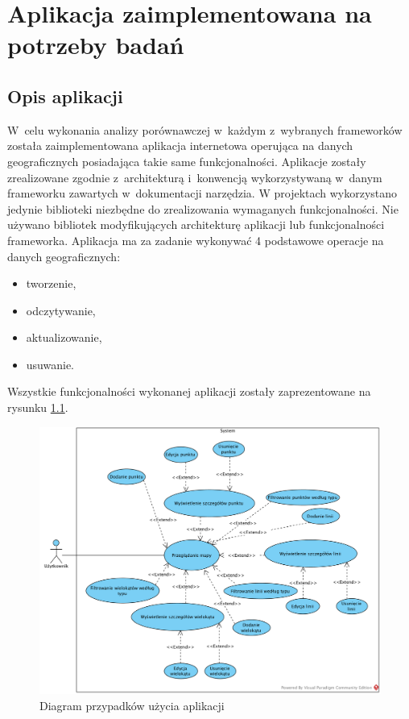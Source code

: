 \documentclass[printmode]{mgr}
\begin{document}
\chapter{Aplikacja zaimplementowana na potrzeby badań}
\section{Opis aplikacji}

W~celu wykonania analizy porównawczej w~każdym z~wybranych frameworków została zaimplementowana aplikacja internetowa operująca na danych geograficznych posiadająca takie same funkcjonalności. Aplikacje zostały zrealizowane zgodnie z~architekturą i~konwencją wykorzystywaną w~danym frameworku zawartych w~dokumentacji narzędzia. W projektach wykorzystano jedynie biblioteki niezbędne do zrealizowania wymaganych funkcjonalności. Nie używano bibliotek modyfikujących architekturę aplikacji lub funkcjonalności frameworka.
Aplikacja ma za zadanie wykonywać 4 podstawowe operacje na danych geograficznych:
\begin{itemize}
  \item tworzenie,
  \item odczytywanie,
  \item aktualizowanie,
  \item usuwanie.
\end{itemize}

Wszystkie funkcjonalności wykonanej aplikacji zostały zaprezentowane na rysunku \ref{fig:use_cases}.

\begin{figure}[H]
  \centering
  \includegraphics[width=1\linewidth]{pictures/use_cases}
  \caption{Diagram przypadków użycia aplikacji}
  \label{fig:use_cases}
\end{figure}
\end{document}
